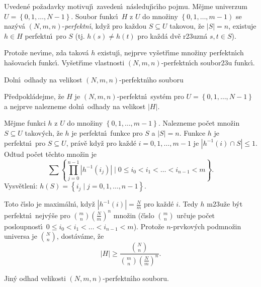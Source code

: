 \flushpar Uveden\'e po\v zadavky motivuj\'\i\ zaveden\'\i\ 
n\'asleduj\'\i c\'\i ho pojmu.\newline 
M\v ejme univerzum $U=\left\{0,1,\dots,N-1\right\}$. Soubor funkc\'\i\ $H$ z 
$U$ do mno\v ziny $\left\{0,1,\dots,m-1\right)$ se naz\'yv\'a 
$\left(N,m,n\right)$-\emph{perfektn\'\i}, kdy\v z pro ka\v zdou $S\subseteq 
U$ 
takovou, \v ze $|S|=n$, existuje $h\in H$ perfektn\'\i\ pro $S$ (tj. 
$h\left(s\right)\ne h\left(t\right)$ pro ka\v zd\'a dv\v e r\accent23uzn\'a $s,t\in S$).

\flushpar Proto\v ze nev\'\i me, zda takov\'a $h$ existuj\'\i , nejprve 
vy\v set\v r\'\i me mno\-\v zi\-ny perfektn\'\i ch ha\v sovac\'\i ch 
funkc\'\i . Vy\v set\v r\'\i me vlastnosti $\left(N,m,n\right)$-perfektn\'\i ch 
soubor\accent23u funkc\'\i .
\medskip

\subhead
Doln\'\i\ odhady na velikost $\left(N,m,n\right)$-perfektn\'\i ho souboru
\endsubhead
\smallskip

\flushpar P\v redpokl\'adejme, \v ze $H$  je $\left(N,m,n\right)$-perfektn\'\i\ 
syst\'em pro $U=\left\{0,1,\dots,N-1\right\}$ a nejprve nalezneme doln\'\i\ 
odhady na velikost $|H|$.
\medskip

\flushpar M\v ejme funkci $h$ z $U$ do mno\v ziny $\left\{0,1,\dots,m-
1\right\}$. 
Nalezneme po\v cet mno\v zin $S\subseteq U$ takov\'ych, \v ze  
$h$ je perfektn\'\i\ funkce pro $S$ a $|S|=n$. Funkce $h$ je perfektn\'\i\ pro 
$S\subseteq U$, pr\'av\v e kdy\v z pro ka\v zd\'e $i=0,1,\dots,m-
1$ je 
$|h^{-1}\left(i\right)\cap S|\le 1$. Odtud po\v cet t\v echto mno\v zin je
$$\sum \left\{\prod_{j=0}^{n-1}|h^{-1}\left(i_j\right)|\mid 0\le i_0<i_1<\dots<i_{
n-1}<m\right\}.$$
\flushpar Vysv\v etlen\'\i : $h\left(S\right)=\left\{i_j\mid j=0,1,\dots,n-1\right\}$.
\medskip

\flushpar Toto \v c\'\i slo je maxim\'aln\'\i , kdy\v z $|h^{-1}\left(
i\right)|=\frac Nm$ pro ka\v zd\'e $i$. 
Tedy $h$ m\accent23u\v ze b\'yt perfektn\'\i\ nejv\'y\v se pro $\binom 
mn\left(\frac Nm\right)^n$ 
mno\v zin (\v c\'\i slo $\binom mn$ ur\v cuje po\v cet posloupnost\'\i\ 
$0\le i_0<i_1<\dots<i_{n-1}<m$). Proto\v ze $n$-prvkov\'ych 
podmno\v zin universa je $\binom Nn$, dost\'av\'ame, \v ze 
$$|H|\ge\frac {\binom Nn}{\binom mn\left(\frac Nm\right)^n}.$$

\flushpar Jin\'y odhad velikosti $\left(N,m,n\right)$-perfektn\'\i ho souboru.
\medskip

